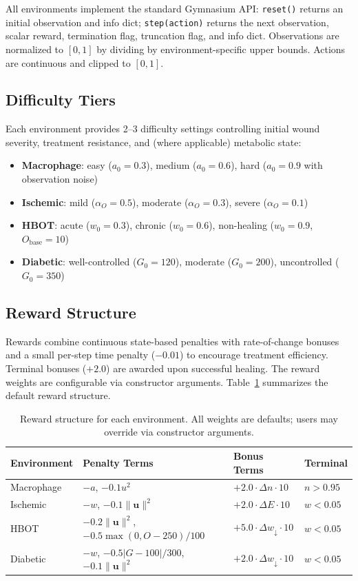 \documentclass[11pt,a4paper]{article}
\begin{document}
All environments implement the standard Gymnasium API: \texttt{reset()} returns an initial observation and info dict; \texttt{step(action)} returns the next observation, scalar reward, termination flag, truncation flag, and info dict. Observations are normalized to $[0, 1]$ by dividing by environment-specific upper bounds. Actions are continuous and clipped to $[0, 1]$.

\subsection{Difficulty Tiers}

Each environment provides 2--3 difficulty settings controlling initial wound severity, treatment resistance, and (where applicable) metabolic state:

\begin{itemize}
    \item \textbf{Macrophage}: easy ($a_0 = 0.3$), medium ($a_0 = 0.6$), hard ($a_0 = 0.9$ with observation noise)
    \item \textbf{Ischemic}: mild ($\alpha_O = 0.5$), moderate ($\alpha_O = 0.3$), severe ($\alpha_O = 0.1$)
    \item \textbf{HBOT}: acute ($w_0 = 0.3$), chronic ($w_0 = 0.6$), non-healing ($w_0 = 0.9$, $O_{\text{base}} = 10$)
    \item \textbf{Diabetic}: well-controlled ($G_0 = 120$), moderate ($G_0 = 200$), uncontrolled ($G_0 = 350$)
\end{itemize}

\subsection{Reward Structure}

Rewards combine continuous state-based penalties with rate-of-change bonuses and a small per-step time penalty ($-0.01$) to encourage treatment efficiency. Terminal bonuses ($+2.0$) are awarded upon successful healing. The reward weights are configurable via constructor arguments. Table~\ref{tab:rewards} summarizes the default reward structure.

\begin{table}[h]
\centering
\caption{Reward structure for each environment. All weights are defaults; users may override via constructor arguments.}
\label{tab:rewards}
\begin{tabular}{@{}llll@{}}
\toprule
Environment & Penalty Terms & Bonus Terms & Terminal \\
\midrule
Macrophage & $-a$, $-0.1 u^2$ & $+2.0 \cdot \Delta n \cdot 10$ & $n > 0.95$ \\
Ischemic & $-w$, $-0.1 \|\mathbf{u}\|^2$ & $+2.0 \cdot \Delta E \cdot 10$ & $w < 0.05$ \\
HBOT & $-0.2 \|\mathbf{u}\|^2$, $-0.5 \max(0, O - 250)/100$ & $+5.0 \cdot \Delta w_{\downarrow} \cdot 10$ & $w < 0.05$ \\
Diabetic & $-w$, $-0.5|G-100|/300$, $-0.1 \|\mathbf{u}\|^2$ & $+2.0 \cdot \Delta w_{\downarrow} \cdot 10$ & $w < 0.05$ \\
\bottomrule
\end{tabular}
\end{table}
\end{document}
